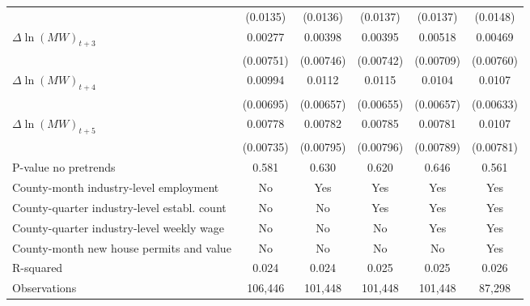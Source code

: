 {\begin{tabular}{l*{5}{c}}
          & (0.0135)         & (0.0136)         & (0.0137)         & (0.0137)         & (0.0148)         \\
[1em]
$\Delta \ln(MW)_{t+3}$&  0.00277         &  0.00398         &  0.00395         &  0.00518         &  0.00469         \\
          &(0.00751)         &(0.00746)         &(0.00742)         &(0.00709)         &(0.00760)         \\
[1em]
$\Delta \ln(MW)_{t+4}$&  0.00994         &   0.0112\sym{*}  &   0.0115\sym{*}  &   0.0104         &   0.0107         \\
          &(0.00695)         &(0.00657)         &(0.00655)         &(0.00657)         &(0.00633)         \\
[1em]
$\Delta \ln(MW)_{t+5}$&  0.00778         &  0.00782         &  0.00785         &  0.00781         &   0.0107         \\
          &(0.00735)         &(0.00795)         &(0.00796)         &(0.00789)         &(0.00781)         \\
\hline
P-value no pretrends&    0.581         &    0.630         &    0.620         &    0.646         &    0.561         \\
County-month industry-level employment&       No         &      Yes         &      Yes         &      Yes         &      Yes         \\
County-quarter industry-level establ. count&       No         &       No         &      Yes         &      Yes         &      Yes         \\
County-quarter industry-level weekly wage&       No         &       No         &       No         &      Yes         &      Yes         \\
County-month new house permits and value&       No         &       No         &       No         &       No         &      Yes         \\
R-squared &    0.024         &    0.024         &    0.025         &    0.025         &    0.026         \\
Observations&  106,446         &  101,448         &  101,448         &  101,448         &   87,298         \\
\hline\hline
\end{tabular}
}
